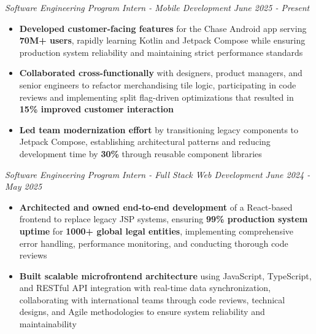 \documentclass[letterpaper]{article}
\newenvironment{tightitemize}{%
  \begin{itemize}\small\setlength{\baselineskip}{0.95\baselineskip}\itemsep -1mm%
}{\end{itemize}}
\begin{document}
    \textit{Software Engineering Program Intern - Mobile Development} \hfill \textsl{June 2025 - Present}\\
    \vspace{-7pt}
    \begin{tightitemize} \itemsep -1mm

            \item \textbf{Developed customer-facing features} for the Chase Android app serving \textbf{70M+ users}, rapidly learning Kotlin and Jetpack Compose while ensuring production system reliability and maintaining strict performance standards

            \item \textbf{Collaborated cross-functionally} with designers, product managers, and senior engineers to refactor merchandising tile logic, participating in code reviews and implementing split flag-driven optimizations that resulted in \textbf{15\% improved customer interaction}

            \item \textbf{Led team modernization effort} by transitioning legacy components to Jetpack Compose, establishing architectural patterns and reducing development time by \textbf{30\%} through reusable component libraries
                    
    \end{tightitemize}
    \textit{Software Engineering Program Intern - Full Stack Web Development} \hfill \textsl{June 2024 - May 2025}\\
    \vspace{-7pt}
    \begin{tightitemize} \itemsep -1mm

            \item \textbf{Architected and owned end-to-end development} of a React-based frontend to replace legacy JSP systems, ensuring \textbf{99\% production system uptime} for \textbf{1000+ global legal entities}, implementing comprehensive error handling, performance monitoring, and conducting thorough code reviews

            \item \textbf{Built scalable microfrontend architecture} using JavaScript, TypeScript, and RESTful API integration with real-time data synchronization, collaborating with international teams through code reviews, technical designs, and Agile methodologies to ensure system reliability and maintainability
                    
    \end{tightitemize}
    \vspace{-2mm}
\end{document}
